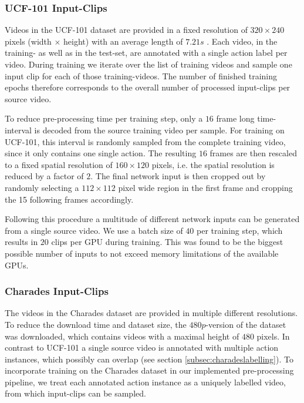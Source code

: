 \subsubsection{UCF-101 Input-Clips}
Videos in the UCF-101 dataset are provided in a fixed resolution of $320 \times 240$ pixels (width $\times$ height) with an average length of $7.21s$ \cite{soomro_ucf101:_2012}.
Each video, in the training- as well as in the test-set, are annotated with a single action label per video.
During training we iterate over the list of training videos and sample one input clip for each of those training-videos.
The number of finished training epochs therefore corresponds to the overall number of processed input-clips per source video.

To reduce pre-processing time per training step, only a $16$ frame long time-interval is decoded from the source training video per sample.
For training on UCF-101, this interval is randomly sampled from the complete training video, since it only contains one single action.
The resulting $16$ frames are then rescaled to a fixed spatial resolution of $160 \times 120$ pixels, i.e. the spatial resolution is reduced by a factor of $2$.
The final network input is then cropped out by randomly selecting a $112 \times 112$ pixel wide region in the first frame and cropping the 15 following frames accordingly.

Following this procedure a multitude of different network inputs can be generated from a single source video.
We use a batch size of $40$ per training step, which results in $20$ clips per GPU during training.
This was found to be the biggest possible number of inputs to not exceed memory limitations of the available GPUs.

\subsubsection{Charades Input-Clips}
The videos in the Charades dataset are provided in multiple different resolutions.
To reduce the download time and dataset size, the $480p$-version of the dataset was downloaded, which contains videos with a maximal height of $480$ pixels.
In contrast to UCF-101 a single source video is annotated with multiple action instances, which possibly can overlap (see section \ref{subsec:charadeslabelling}).
To incorporate training on the Charades dataset in our implemented pre-processing pipeline, we treat each annotated action instance as a uniquely labelled video, from which input-clips can be sampled.

